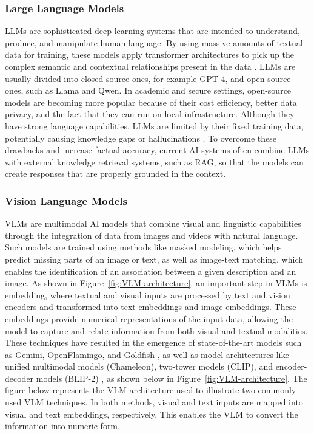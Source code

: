 \documentclass[11pt,a4paper]{report}
\begin{document}
\subsubsection{Large Language Models}
\acp{LLM} are sophisticated deep learning systems that are intended to understand, produce, and manipulate human language. By using massive amounts of textual data for training, these models apply transformer architectures to pick up the complex semantic and contextual relationships present in the data \cite{Zhao2023ASO}. \acp{LLM} are usually divided into closed-source ones, for example GPT-4, and open-source ones, such as Llama and Qwen. In academic and secure settings, open-source models are becoming more popular because of their cost efficiency, better data privacy, and the fact that they can run on local infrastructure. Although they have strong language capabilities, \acp{LLM} are limited by their fixed training data, potentially causing knowledge gaps or hallucinations \cite{Ji2022SurveyOH}. To overcome these drawbacks and increase factual accuracy, current \ac{AI} systems often combine \acp{LLM} with external knowledge retrieval systems, such as \ac{RAG}, so that the models can create responses that are properly grounded in the context.

\subsubsection{Vision Language Models}
\acp{VLM} are multimodal AI models that combine visual and linguistic capabilities through the integration of data from images and videos with natural language. Such models are trained using methods like masked modeling, which helps predict missing parts of an image or text, as well as image-text matching, which enables the identification of an association between a given description and an image. As shown in Figure~\ref{fig:VLM-architecture}, an important step in \acp{VLM} is embedding, where textual and visual inputs are processed by text and vision encoders and transformed into text embeddings and image embeddings. These embeddings provide numerical representations of the input data, allowing the model to capture and relate information from both visual and textual modalities. These techniques have resulted in the emergence of state-of-the-art models such as Gemini, OpenFlamingo, and Goldfish \cite{Bordes2024AnIT}, as well as model architectures like unified multimodal models (Chameleon), two-tower models (CLIP), and encoder-decoder models (BLIP-2) \cite{Ray2024ERVQAAD}, as shown below in Figure~\ref{fig:VLM-architecture}. The figure below represents the \ac{VLM} architecture used to illustrate two commonly used \ac{VLM} techniques. In both methods, visual and text inputs are mapped into visual and text embeddings, respectively. This enables the \ac{VLM} to convert the information into numeric form.
\end{document}
